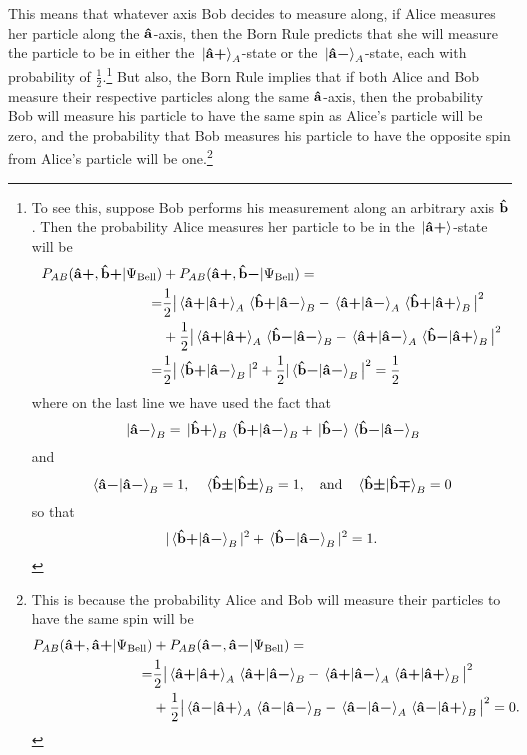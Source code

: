 This means that whatever axis Bob decides to measure along, if Alice measures her particle along the $\vb{\hat{{a}}}$-axis, then the Born Rule predicts that she will measure the particle to be in either the $\ket*{{\vb{\hat{{a}}}\bm{+}}}_A$-state or the $\ket*{{\vb{\hat{{a}}}\bm{-}}}_A$-state, each with probability of $\frac{1}{2}$.\footnote{To see this, suppose Bob performs his measurement along an arbitrary axis $\vb{\hat{{b}}}$. Then the probability Alice measures her particle to be in the $\ket*{{\vb{\hat{{a}}}\bm{+}}}$-state will be 
\begin{equation}
    \begin{split}
        P_{AB}(\uvbp{a}, \uvbp{b}|\Psi_{\text{Bell}})&+P_{AB}(\uvbp{a}, \uvbm{b}|\Psi_{\text{Bell}})= \\
        =&\frac{1}{2}\big| \ip*{\uvbp{a}}{\uvbp{a}}_A\ip*{\uvbp{b}}{\uvbm{a}}_B-\ip*{\uvbp{a}}{\uvbm{a}}_A\ip*{\uvbp{b}}{\uvbp{a}}_B\big|^2\\
        &+\frac{1}{2}\big|\ip*{\uvbp{a}}{\uvbp{a}}_A\ip*{\uvbm{b}}{\uvbm{a}}_B-\ip*{\uvbp{a}}{\uvbm{a}}_A\ip*{\uvbm{b}}{\uvbp{a}}_B\big|^2\\
        =&\frac{1}{2}\big|\ip*{\uvbp{b}}{\uvbm{a}}_B|^2+\frac{1}{2}|\ip*{\uvbm{b}}{\uvbm{a}}_B\big|^2=\frac{1}{2}
    \end{split}
\end{equation} 
where on the last line we have used the fact that 
$$\ket*{\uvbm{a}}_B=\ket*{\uvbp{b}}_B\ip*{\uvbp{b}}{\uvbm{a}}_B+\ket*{\uvbm{b}}\ip*{\uvbm{b}}{\uvbm{a}}_B$$
and 
$$\ip*{\uvbm{a}}{\uvbm{a}}_B=1,\quad\ip*{\uvbpm{b}}{\uvbpm{b}}_B=1,\quad\text{and}\quad \ip*{\uvbpm{b}}{\uvbmp{b}}_B=0$$
so that 
$$|\ip*{\uvbp{b}}{\uvbm{a}}_B|^2+\ip*{\uvbm{b}}{\uvbm{a}}_B|^2=1.$$
} But also, the Born Rule implies that if both Alice and Bob measure their respective particles along the same $\vb{\hat{{a}}}$-axis, then the probability Bob will measure his particle to have the same spin as Alice's particle will be zero, and the probability that Bob measures his particle to have the opposite spin from Alice's particle will be one.\footnote{This is because the probability Alice and Bob will measure their particles to have the same spin will be 
\begin{equation*}
\begin{split}
    P_{AB}(\uvbp{a}, \uvbp{a}|\Psi_{\text{Bell}})&+P_{AB}(\uvbm{a}, \uvbm{a}|\Psi_{\text{Bell}})= \\
    =&\frac{1}{2}\big| \ip*{\uvbp{a}}{\uvbp{a}}_A\ip*{\uvbp{a}}{\uvbm{a}}_B-\ip*{\uvbp{a}}{\uvbm{a}}_A\ip*{\uvbp{a}}{\uvbp{a}}_B\big|^2\\
    &+\frac{1}{2}\big|\ip*{\uvbm{a}}{\uvbp{a}}_A\ip*{\uvbm{a}}{\uvbm{a}}_B-\ip*{\uvbm{a}}{\uvbm{a}}_A\ip*{\uvbm{a}}{\uvbp{a}}_B\big|^2=0.

\end{split}
\end{equation*}}

